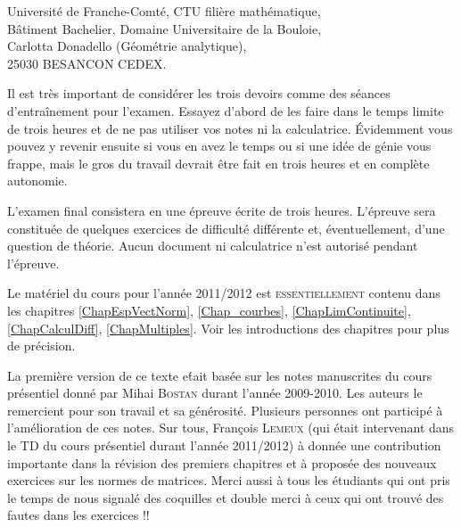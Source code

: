 \begin{center}
  Université de Franche-Comté, CTU filière mathématique,\\
Bâtiment Bachelier, Domaine Universitaire de la Bouloie,\\
 Carlotta Donadello (Géométrie analytique),\\
 25030 BESANCON CEDEX.
\end{center}

Il est très important de considérer les trois devoirs comme des séances d'entraînement pour l'examen. Essayez d'abord de les faire dans le temps limite de trois heures et de ne pas utiliser vos notes ni la calculatrice. Évidemment vous pouvez y revenir ensuite si vous en avez le temps ou si une idée de génie vous frappe, mais le gros du travail devrait être fait en trois heures et en complète autonomie.  

L'examen final consistera en une épreuve écrite de trois heures. L’épreuve sera constituée de quelques exercices de difficulté différente et, éventuellement, d’une question de théorie.  Aucun document ni calculatrice n’est autorisé pendant l'épreuve.

Le matériel du cours pour l'année 2011/2012 est \textsc{essentiellement} contenu dans les chapitres  \ref{ChapEspVectNorm},  \ref{Chap_courbes}, \ref{ChapLimContinuite}, \ref{ChapCalculDiff}, \ref{ChapMultiples}. Voir les introductions des chapitres pour plus de précision. 

\vfill

La première version de ce texte e\'tait basée sur les notes manuscrites du cours présentiel donné par Mihai \textsc{Bostan} durant l'année 2009-2010. Les auteurs le remercient pour son travail et sa générosité. Plusieurs personnes ont participé à l'amélioration de ces notes. Sur tous, François \textsc{Lemeux} (qui était intervenant dans le TD du cours présentiel durant l'année 2011/2012) à donnée une contribution importante dans la révision des premiers chapitres et à proposée des nouveaux exercices sur les normes de matrices. Merci aussi à tous les étudiants qui ont pris le temps de nous signalé des coquilles et double merci à  ceux qui ont trouvé des fautes dans les exercices !!


